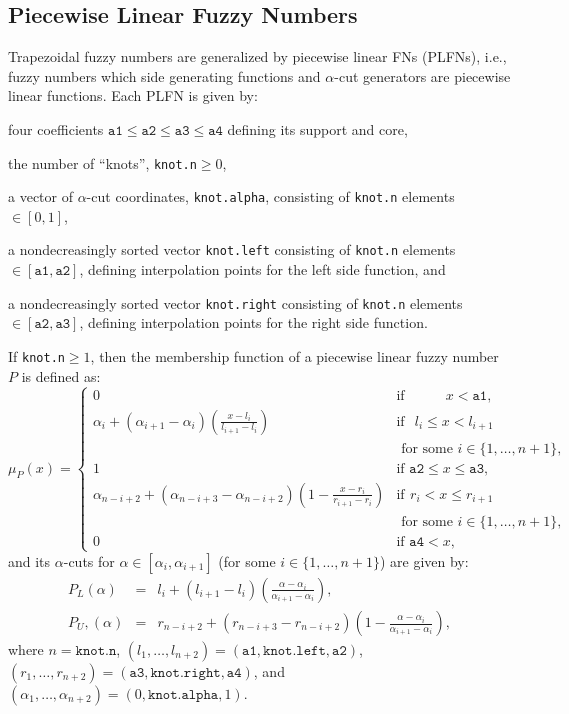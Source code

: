 \documentclass[11pt]{article}\usepackage[]{graphicx}\usepackage[]{color}
\newcommand{\hlkwc}[1]{\textcolor[rgb]{0.333,0.667,0.333}{#1}}%
\newcommand{\argument}[1]{\texttt{\hlkwc{#1}}}
\begin{document}
\subsection{Piecewise Linear Fuzzy Numbers}

Trapezoidal fuzzy numbers are generalized by piecewise linear FNs (PLFNs),
i.e., fuzzy numbers which side generating functions and $\alpha$-cut
generators are piecewise linear functions.
Each PLFN is given by:
\begin{itemize*}
\item four coefficients $\mathtt{a1}\le\mathtt{a2}\le\mathtt{a3}\le\mathtt{a4}$
defining its support and core,
\item the number of ``knots'', \argument{knot.n}$\ge 0$,
\item a vector of $\alpha$-cut coordinates, \argument{knot.alpha}, consisting of \argument{knot.n} elements $\in[0,1]$,
\item a nondecreasingly sorted vector \argument{knot.left} consisting of \argument{knot.n} elements $\in[\mathtt{a1},\mathtt{a2}]$,
defining interpolation points for the left side function, and
\item a nondecreasingly sorted vector \argument{knot.right} consisting of \argument{knot.n} elements $\in[\mathtt{a2},\mathtt{a3}]$,
defining interpolation points for the right side function.
\end{itemize*}

If \argument{knot.n}$\ge 1$, then the membership function of
a piecewise linear fuzzy number $P$ is defined as:
\begin{equation}
\mu_P(x) = \left\{\begin{array}{ll}
0 & \text{if } \phantom{\mathtt{a2}\le\ } x<\mathtt{a1}, \\
\alpha_i+(\alpha_{i+1}-\alpha_i) \left(\frac{x-l_i}{l_{i+1}-l_i}\right)  & \text{if }\ \, l_i \le x < l_{i+1}\\
& \text{ for some } i\in\{1,\dots,n+1\}, \\
1 & \text{if } \mathtt{a2}\le x\le\mathtt{a3}, \\
\alpha_{n-i+2}+(\alpha_{n-i+3}-\alpha_{n-i+2}) \left(1-\frac{x-r_i}{r_{i+1}-r_i}\right)  & \text{if}\ \, r_i < x \le r_{i+1} \\
& \text{ for some } i\in\{1,\dots,n+1\}, \\
0 & \text{if } \mathtt{a4}<x,
\end{array}\right.
\end{equation}
and its $\alpha$-cuts for $\alpha\in[\alpha_i, \alpha_{i+1}]$
(for some $i\in\{1,\dots,n+1\}$) are given by:
\begin{eqnarray}
P_L(\alpha) & = & l_i+(l_{i+1}-l_i)\left(\frac{\alpha-\alpha_i}{\alpha_{i+1}-\alpha_i}\right), \\
P_U,(\alpha) & = & r_{n-i+2}+(r_{n-i+3}-r_{n-i+2})\left(1-\frac{\alpha-\alpha_i}{\alpha_{i+1}-\alpha_i}\right),
\end{eqnarray}
where $n=\mathtt{knot.n}$, $(l_1,\dots,l_{n+2}) = (\mathtt{a1},\mathtt{knot.left},\mathtt{a2})$,
$(r_1,\dots,r_{n+2}) = (\mathtt{a3},\mathtt{knot.right},\mathtt{a4})$,
and $(\alpha_1,\dots,\alpha_{n+2})=(0,\mathtt{knot.alpha},1)$.
\end{document}
